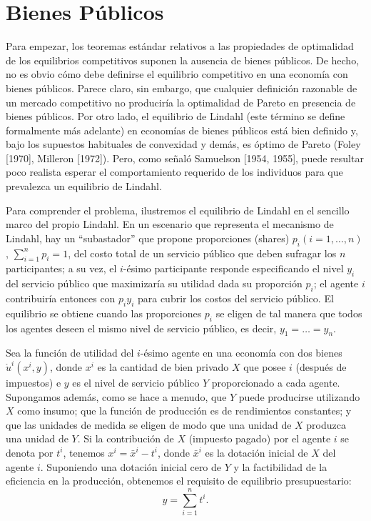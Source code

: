 \documentclass[12pt, letterpaper]{article}
\begin{document}
\section*{Bienes Públicos}

Para empezar, los teoremas estándar relativos a las propiedades de optimalidad de los equilibrios competitivos suponen la ausencia de bienes públicos. De hecho, no es obvio cómo debe definirse el equilibrio competitivo en una economía con bienes públicos. Parece claro, sin embargo, que cualquier definición razonable de un mercado competitivo no produciría la optimalidad de Pareto en presencia de bienes públicos. Por otro lado, el equilibrio de Lindahl (este término se define formalmente más adelante) en economías de bienes públicos está bien definido y, bajo los supuestos habituales de convexidad y demás, es óptimo de Pareto (Foley [1970], Milleron [1972]). Pero, como señaló Samuelson [1954, 1955], puede resultar poco realista esperar el comportamiento requerido de los individuos para que prevalezca un equilibrio de Lindahl.

Para comprender el problema, ilustremos el equilibrio de Lindahl en el sencillo marco del propio Lindahl. En un escenario que representa el mecanismo de Lindahl, hay un ``subastador'' que propone proporciones (shares) $p_i (i = 1, \dots, n)$, $\sum_{i=1}^n p_i = 1$, del costo total de un servicio público que deben sufragar los $n$ participantes; a su vez, el $i$-ésimo participante responde especificando el nivel $y_i$ del servicio público que maximizaría su utilidad dada su proporción $p_i$; el agente $i$ contribuiría entonces con $p_i y_i$ para cubrir los costos del servicio público. El equilibrio se obtiene cuando las proporciones $p_i$ se eligen de tal manera que todos los agentes deseen el mismo nivel de servicio público, es decir, $y_1 = \dots = y_n$.

Sea la función de utilidad del $i$-ésimo agente en una economía con dos bienes $\mathring{u}^i(x^i, y)$, donde $x^i$ es la cantidad de bien privado $X$ que posee $i$ (después de impuestos) e $y$ es el nivel de servicio público $Y$ proporcionado a cada agente. Supongamos además, como se hace a menudo, que $Y$ puede producirse utilizando $X$ como insumo; que la función de producción es de rendimientos constantes; y que las unidades de medida se eligen de modo que una unidad de $X$ produzca una unidad de $Y$. Si la contribución de $X$ (impuesto pagado) por el agente $i$ se denota por $t^i$, tenemos $x^i = \bar{x}^i - t^i$, donde $\bar{x}^i$ es la dotación inicial de $X$ del agente $i$. Suponiendo una dotación inicial cero de $Y$ y la factibilidad de la eficiencia en la producción, obtenemos el requisito de equilibrio presupuestario:
\[
y = \sum_{i=1}^{n} t^i.
\]
\end{document}
